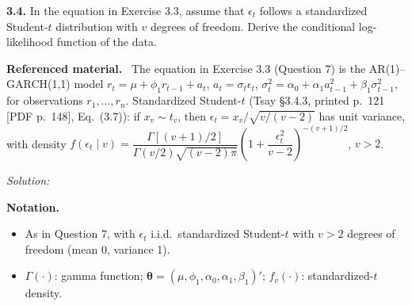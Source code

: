 \documentclass[11pt,a4paper]{article}
\newif\ifsolucoes
\newcommand{\espacoresol}{4.5cm}   %
\newenvironment{refmat}{\par\smallskip\noindent\begin{minipage}{\linewidth}\small\textbf{Referenced material.}~}{\end{minipage}\par\smallskip}
\newenvironment{notacao}{\par\smallskip\noindent\textbf{Notation.}\begin{itemize}[leftmargin=1.4em,topsep=1pt,itemsep=0pt]\small}{\end{itemize}}
\newcommand{\resolespaco}{\ifsolucoes\else\par\textit{Solution:}\vspace{\espacoresol}\par\fi}
\begin{document}
\noindent\textbf{3.4.} In the equation in Exercise 3.3, assume that $\epsilon_t$ follows a standardized
Student-$t$ distribution with $v$ degrees of freedom. Derive the conditional log-likelihood function of the data.
\begin{refmat}
The equation in Exercise 3.3 (Question 7) is the AR(1)--GARCH(1,1) model
$r_t=\mu+\phi_1r_{t-1}+a_t$, $a_t=\sigma_t\epsilon_t$, $\sigma_t^2=\alpha_0+\alpha_1a_{t-1}^2+\beta_1\sigma_{t-1}^2$,
for observations $r_1,\dots,r_n$. Standardized Student-$t$ (Tsay \S3.4.3, printed p.~121 [PDF p.~148],
Eq.~(3.7)): if $x_v\sim t_v$, then $\epsilon_t=x_v/\sqrt{v/(v-2)}$ has unit variance, with density
$f(\epsilon_t\mid v)=\dfrac{\Gamma[(v+1)/2]}{\Gamma(v/2)\sqrt{(v-2)\pi}}\left(1+\dfrac{\epsilon_t^2}{v-2}\right)^{-(v+1)/2}$, $v>2$.
\end{refmat}
\resolespaco
\begin{sol}
\begin{notacao}
\item As in Question 7, with $\epsilon_t$ i.i.d.\ standardized Student-$t$ with $v>2$ degrees of freedom (mean 0, variance 1).
\item $\Gamma(\cdot)$: gamma function; $\boldsymbol\theta=(\mu,\phi_1,\alpha_0,\alpha_1,\beta_1)'$; $f_v(\cdot)$: standardized-$t$ density.
\end{notacao}


\end{sol}
\end{document}
